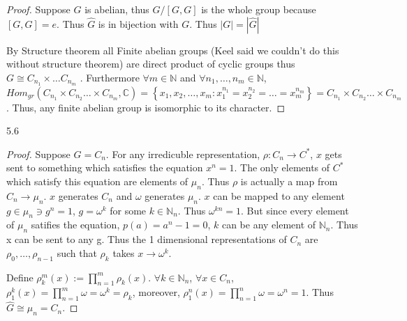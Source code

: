 \documentclass{article}
\newcommand{\C}{\mathbb{C}}
\newcommand{\N}{\mathbb{N}}
\begin{document}
\begin{proof}
    Suppose $G$ is abelian, thus $G / [G , G]$ is the whole group because $[G, G] = e$. Thus $\widehat{G}$ is in bijection with $G$. Thus $|G| = |\widehat{G}|$  
    
    By Structure theorem all Finite abelian groups (Keel said we couldn't do this without structure theorem) are direct product of cyclic groups thus $G \cong C_{n_1} \times \dots C_{n_m}$ . Furthermore $\forall m \in \N$ and $\forall n_1, \dots, n_m \in \N$, $Hom_{gr}(C_{n_1} \times C_{n_2} \dots \times C_{n_m}, \C) = \left\{ x_1, x_2, \dots, x_m : x_1^{n_1} = x_2^{n_2} = \dots = x_m^{n_m} \right\} = C_{n_1} \times C_{n_2} \dots \times C_{n_m}$. Thus, any finite abelian group is isomorphic to its character. 
\end{proof}

\bigskip

\begin{PROB}{5.6}\label{Problem 5.6.}
\end{PROB}
\begin{proof}
    Suppose $G = C_n$. For any irredicuble representation, $\rho: C_n \to C^*$, $x$ gets sent to something which satisfies the equation $x^n = 1$. The only elements of $C^*$ which satisfy this equation are elements of $\mu_n$. Thus $\rho$ is actually a map from $C_n \to \mu_n$. $x$ generates $C_n$ and $\omega$ generates $\mu_n$. $x$ can be mapped to any element $g \in \mu_n \ni g^n = 1$, $g = \omega^k$ for some $k \in \N_n$. Thus $\omega^{kn} = 1$. But since every element of $\mu_n$ satifies the equation, $p(a) = a^n - 1 = 0$, $k$ can be any element of $\N_n$. Thus x can be sent to any g. Thus the 1 dimensional representations of $C_n$ are $\rho_0, \dots, \rho_{n - 1}$ such that $\rho_k$ takes $x \to \omega^k$.

    Define $\rho_k^m(x) := \prod_{n = 1}^{m} \rho_k(x)$. $\forall k \in \N_n$, $\forall x \in C_n$, $\rho_1^k(x) = \prod_{n = 1}^{m} \omega = \omega^k = \rho_k$, moreover, $\rho_1^n(x) = \prod_{n = 1}^{n} \omega = \omega^n = 1$. Thus $\widehat{G} \cong \mu_n = C_n$.  
\end{proof}

\bigskip
\end{document}
